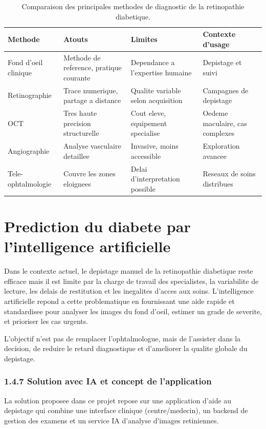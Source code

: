 \begin{table}[H]
\centering
\caption{Comparaison des principales methodes de diagnostic de la retinopathie diabetique.}
\label{tab:comparaison_diagnostic_ch1}
\begin{tabular}{|p{3.8cm}|p{3.2cm}|p{3.6cm}|p{3.6cm}|}
\hline
\textbf{Methode} & \textbf{Atouts} & \textbf{Limites} & \textbf{Contexte d'usage} \\
\hline
Fond d'oeil clinique & Methode de reference, pratique courante & Dependance a l'expertise humaine & Depistage et suivi \\
\hline
Retinographie & Trace numerique, partage a distance & Qualite variable selon acquisition & Campagnes de depistage \\
\hline
OCT & Tres haute precision structurelle & Cout eleve, equipement specialise & Oedeme maculaire, cas complexes \\
\hline
Angiographie & Analyse vasculaire detaillee & Invasive, moins accessible & Exploration avancee \\
\hline
Tele-ophtalmologie & Couvre les zones eloignees & Delai d'interpretation possible & Reseaux de soins distribues \\
\hline
\end{tabular}
\end{table}

\section{Prediction du diabete par l'intelligence artificielle}
Dans le contexte actuel, le depistage manuel de la retinopathie diabetique reste efficace
mais il est limite par la charge de travail des specialistes, la variabilite de lecture,
les delais de restitution et les inegalites d'acces aux soins.
L'intelligence artificielle repond a cette problematique en fournissant une aide rapide
et standardisee pour analyser les images du fond d'oeil, estimer un grade de severite,
et prioriser les cas urgents.

L'objectif n'est pas de remplacer l'ophtalmologue, mais de l'assister dans la decision,
de reduire le retard diagnostique et d'ameliorer la qualite globale du depistage.

\subsubsection*{1.4.7 Solution avec IA et concept de l'application}
La solution proposee dans ce projet repose sur une application d'aide au depistage
qui combine une interface clinique (centre/medecin), un backend de gestion des examens
et un service IA d'analyse d'images retiniennes.


